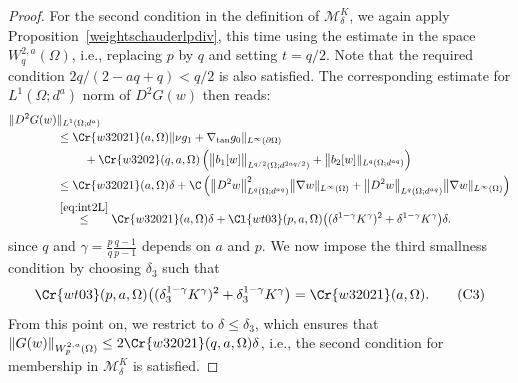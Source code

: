 \documentclass[12pt,a4paper,twoside]{article}
\newcommand{\M}{\mathcal {M}}
\begin{document}
\begin{proof}
 
 For the second condition in the definition of $\M_\delta^K$, we again apply Proposition~\ref{weightschauderlpdiv}, this time using the estimate in the space  $W^{2,a}_q(\Omega)$, i.e., replacing $p$ by $q$ and setting $t=q/2$. Note that the required condition ${2q}/({2-aq+q}) <{q}/{2}$ is also satisfied. The corresponding estimate for   ${L^1(\Omega;d^a)} $ norm of $D^2G(w)$ then reads:
\begin{align*}
    \|D^2G(w)&\| _{L^1(\Omega;d^a)} \\
    &\le
     \Cr{w32021}(a,\Omega) 
   \| \nu g_1
   +
   \nabla_{\rm tan} g_0\|_{L^\infty(\partial\Omega)}
     \\
     &\ \qquad + 
        \Cr{w3202}(q, a, \Omega) \left(
    \big\|b_1[w]\big\|_{L^{q/2}(\Omega ;d^{2aq/2})}
   + \big\|b_2[w]\|_{L^{q}(\Omega ;d^{aq})}
    \right)
    \\
    &\le  
    \Cr{w32021}(a,\Omega)  
    \delta
    +
        \C\left( \big\| D^2w\big\|_{L^q(\Omega;d^{aq})}^2 \big\|\nabla w\|_{L^\infty(\Omega)}  
   + \big\| D^2w\big\|_{L^q(\Omega;d^{aq})} \big\|\nabla w\|_{L^\infty(\Omega)}      \right)\\
     &\overset{\eqref{eq:int2L}}{\le}\Cr{w32021}(a,\Omega)  
    \delta  + \Cl{wt03}(p,a,\Omega)\big((\delta^{1-\gamma}K^\gamma)^2 + \delta^{1-\gamma}K^\gamma \big)\delta.
 \end{align*}
 since $q$ and $\gamma=\frac{p}{q}\frac{q-1}{p-1}$ depends on $a $ and $p$. We now impose the third smallness condition by choosing $\delta_3$  such that 
 \begin{align}
     \Cr{wt03}(p,a,\Omega)\big((\delta_3^{1-\gamma}K^{\gamma})^2 + \delta_3^{1-\gamma}K^\gamma \big)
     =
     \Cr{w32021}(a,\Omega) . \tag{C3} \label{eq:wc3}
 \end{align}
From this point on, we restrict to $\delta\le \delta_3$, which ensures that $ \|G(w)\| _{W^{2,a}_p(\Omega)} \le 2 \Cr{w32021}(q,a,\Omega) \delta$, i.e., the second condition for membership in $\M_\delta^K$ is satisfied.
 

\end{proof}
\end{document}
